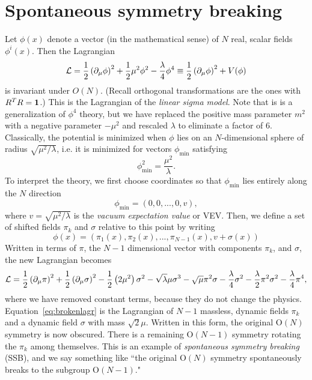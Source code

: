 \section{Spontaneous symmetry breaking}\label{sec:ssb}
Let $\phi(x)$ denote a vector (in the mathematical sense) of $N$ real,
scalar fields $\phi^i(x)$. Then the Lagrangian
\begin{equation}
  \mathcal{L}=\frac{1}{2}\left(\partial_\mu\phi\right)^2
        +\frac{1}{2}\mu^2\phi^2-\frac{\lambda}{4}\phi^4
       \equiv\frac{1}{2}\left(\partial_\mu\phi\right)^2
        +V(\phi)
\end{equation}
is invariant under $O(N)$. (Recall orthogonal transformations are the
ones with $R^TR={\mathbf 1}$.) This is the Lagrangian of the {\it linear
sigma model}. Note that is is a generalization of $\phi^4$ theory,
but we have replaced the positive mass parameter $m^2$ with a
negative parameter $-\mu^2$ and rescaled $\lambda$ to eliminate a factor of 6.
Classically, the potential is minimized when $\phi$ lies
on an $N$-dimensional sphere of radius $\sqrt{\mu^2/\lambda}$, i.e. 
it is minimized for vectors $\phi_\text{min}$ satisfying
\begin{equation}
  \phi_\text{min}^2=\frac{\mu^2}{\lambda}.
\end{equation}
To interpret the theory, we first choose coordinates so that 
$\phi_\text{min}$ lies
entirely along the $N$ direction
\begin{equation}\label{eq:phidir}
  \phi_\text{min}=(0,0,...,0,v),
\end{equation}
where $v=\sqrt{\mu^2/\lambda}$ is the {\it vacuum expectation value} or VEV.
Then, we define a set of shifted fields $\pi_k$ and $\sigma$ relative
to this point by writing
\begin{equation}\label{eq:phishift}
  \phi(x)=\left(\pi_1(x),\pi_2(x),...,\pi_{N-1}(x),v+\sigma(x)\right)
\end{equation}
Written in terms of $\pi$, the $N-1$ dimensional vector with components
$\pi_k$, and $\sigma$, the new Lagrangian becomes
\begin{equation}\label{eq:brokenlagr}
  \mathcal{L}=\frac{1}{2}\left(\partial_\mu\pi\right)^2
        +\frac{1}{2}\left(\partial_\mu\sigma\right)^2
        -\frac{1}{2}\left(2\mu^2\right)\sigma^2-\sqrt{\lambda}\mu\sigma^3
        -\sqrt\mu\pi^2\sigma
        -\frac{\lambda}{4}\sigma^2
        -\frac{\lambda}{2}\pi^2\sigma^2
        -\frac{\lambda}{4}\pi^4,
\end{equation}
where we have removed constant terms, because they do not change the
physics. Equation~\eqref{eq:brokenlagr} is the Lagrangian of $N-1$
massless, dynamic fields $\pi_k$ and a dynamic field $\sigma$ with mass
$\sqrt{2}\mu$. Written in this form, the original $\text{O}(N)$ symmetry
is now obscured. There is a remaining $\text{O}(N-1)$ symmetry
rotating the $\pi_k$ among themselves. This is an example of
{\it spontaneous symmetry breaking} (SSB), and we say something like
``the original $\text{O}(N)$ symmetry spontaneously breaks to
the subgroup $\text{O}(N-1)$." 

